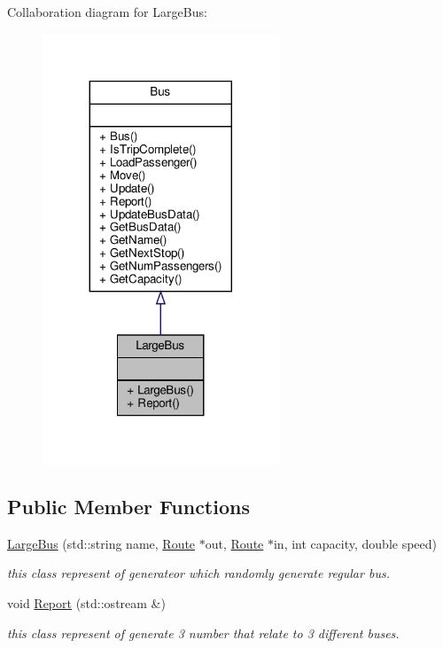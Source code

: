 Collaboration diagram for Large\+Bus\+:\nopagebreak
\begin{figure}[H]
\begin{center}
\leavevmode
\includegraphics[width=200pt]{classLargeBus__coll__graph}
\end{center}
\end{figure}
\subsection*{Public Member Functions}
\begin{DoxyCompactItemize}
\item 
\hyperlink{classLargeBus_a17f3647b231039dbc42b006e51a43aa9}{Large\+Bus} (std\+::string name, \hyperlink{classRoute}{Route} $\ast$out, \hyperlink{classRoute}{Route} $\ast$in, int capacity, double speed)
\begin{DoxyCompactList}\small\item\em this class represent of generateor which randomly generate regular bus. \end{DoxyCompactList}\item 
void \hyperlink{classLargeBus_a401d909a31f2adf60b2f92681a2541d0}{Report} (std\+::ostream \&)
\begin{DoxyCompactList}\small\item\em this class represent of generate 3 number that relate to 3 different buses. \end{DoxyCompactList}\end{DoxyCompactItemize}



